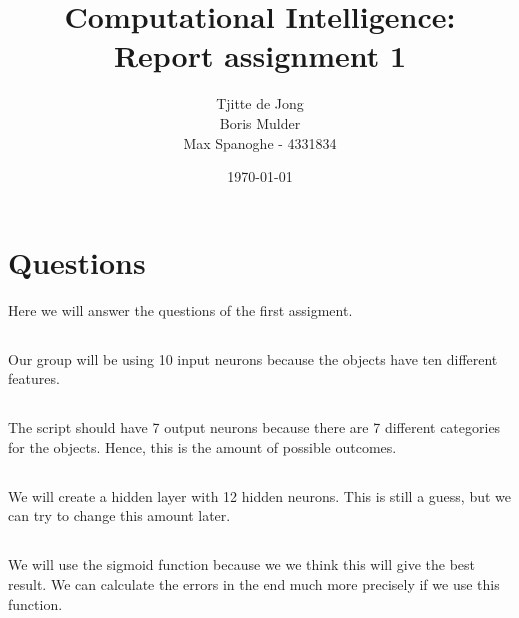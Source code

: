 \documentclass{scrartcl}
\begin{document}
\title{Computational Intelligence:
\\Report assignment 1}
\date{\today{}}

\author{
    \begin{tabular}{l r}
    	\\Tjitte de Jong
	\\Boris Mulder
        \\Max Spanoghe - 4331834
            \end{tabular}
  }
  
  \maketitle \thispagestyle{empty} \pagebreak
  
  \section{Questions}
  Here we will answer the questions of the first assigment.
  
  \subsection{}
  Our group will be using 10 input neurons because the objects have ten different features.
  
  \subsection{}
  The script should have 7 output neurons because there are 7 different categories for the objects.
  Hence, this is the amount of possible outcomes.
  
  \subsection{}
  We will create a hidden layer with 12 hidden neurons. This is still a guess,  but we can try to change
  this amount later.
  
  \subsection{}
  We will use the sigmoid function because we we think this will give the best result. We can calculate the
  errors in the end much more precisely if we use this function.
  
\end{document}
